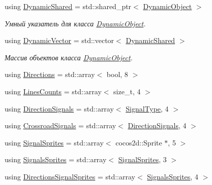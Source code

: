 \begin{DoxyCompactItemize}
\mbox{\label{namespacertm_af668a936c29b476890a79ad1eb19e3cc}} 
using \hyperlink{namespacertm_af668a936c29b476890a79ad1eb19e3cc}{Dynamic\+Shared} = std\+::shared\+\_\+ptr$<$ \hyperlink{classrtm_1_1_dynamic_object}{Dynamic\+Object} $>$
\begin{DoxyCompactList}\small\item\em Умный указатель для класса \hyperlink{classrtm_1_1_dynamic_object}{Dynamic\+Object}. \end{DoxyCompactList}\item 
\mbox{\label{namespacertm_a7fb21a6bf2f6f5947e2875093824c144}} 
using \hyperlink{namespacertm_a7fb21a6bf2f6f5947e2875093824c144}{Dynamic\+Vector} = std\+::vector$<$ \hyperlink{namespacertm_af668a936c29b476890a79ad1eb19e3cc}{Dynamic\+Shared} $>$
\begin{DoxyCompactList}\small\item\em Массив объектов класса \hyperlink{classrtm_1_1_dynamic_object}{Dynamic\+Object}. \end{DoxyCompactList}\item 
using \hyperlink{namespacertm_a4776fbfe59834ff1a16838ad6735b69a}{Directions} = std\+::array$<$ bool, 8 $>$
\item 
using \hyperlink{namespacertm_a14457f3088a92b86a96686b72d3e4eea}{Lines\+Counts} = std\+::array$<$ size\+\_\+t, 4 $>$
\item 
using \hyperlink{namespacertm_a681634e130c2137fe63a658b0e0a5e46}{Direction\+Signals} = std\+::array$<$ \hyperlink{namespacertm_aadb7300c15d57429546fb0b7f8ee0ee6}{Signal\+Type}, 4 $>$
\item 
using \hyperlink{namespacertm_afa6df86cef8e2ebcc053ad994e440354}{Crossroad\+Signals} = std\+::array$<$ \hyperlink{namespacertm_a681634e130c2137fe63a658b0e0a5e46}{Direction\+Signals}, 4 $>$
\item 
using \hyperlink{namespacertm_ab6c6acbd1378bfe5755d77179a7131ff}{Signal\+Sprites} = std\+::array$<$ cocos2d\+::\+Sprite $\ast$, 5 $>$
\item 
using \hyperlink{namespacertm_a260109b3376dc38095724ee80ed72d8e}{Signals\+Sprites} = std\+::array$<$ \hyperlink{namespacertm_ab6c6acbd1378bfe5755d77179a7131ff}{Signal\+Sprites}, 3 $>$
\item 
using \hyperlink{namespacertm_ac9f276c8ed33ee992eb1a1f04a8254a0}{Directions\+Signal\+Sprites} = std\+::array$<$ \hyperlink{namespacertm_a260109b3376dc38095724ee80ed72d8e}{Signals\+Sprites}, 4 $>$
\end{DoxyCompactItemize}
